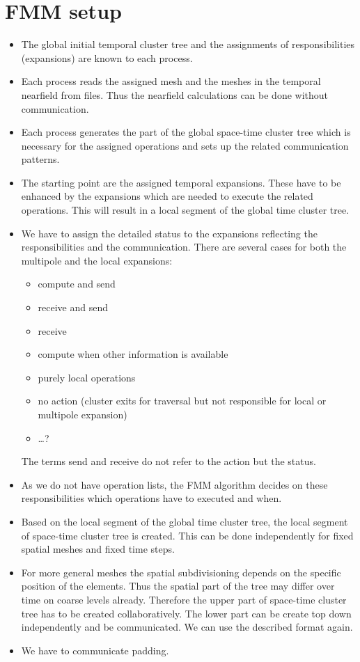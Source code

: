 \documentclass[a4paper,11pt]{article}
\theoremstyle{plain}
\theoremstyle{definition}
\theoremstyle{remark}
\begin{document}
\section{FMM setup}
\begin{itemize}
\item The global initial temporal cluster tree and the assignments of
  responsibilities (expansions)  are known to each process.
\item Each process reads the assigned mesh and the meshes in the temporal nearfield from
  files. Thus the nearfield calculations can be done without communication. 
\item Each process generates the part of the global space-time cluster tree
  which is necessary for the assigned operations and sets up the related
  communication patterns.
\item The starting point are the assigned temporal expansions. These have to be
  enhanced by the  expansions which are needed to execute the related
  operations. This will result in a local segment of the global time cluster tree.
\item We have to assign the detailed status to the expansions reflecting the
  responsibilities and the communication. There are several cases for both the
  multipole and the local expansions:
  \begin{itemize}
  \item compute and send
  \item receive and send
  \item receive 
  \item compute when other information is available
  \item purely local operations
  \item no action (cluster exits for traversal but not responsible for local or multipole expansion)
  \item \ldots ?
  \end{itemize}
  The terms send and receive do not refer to the action but the status.
  \item As we do not have operation lists, the FMM algorithm decides on these responsibilities
    which operations have to executed and when. 
\item Based on the local segment of the global time cluster tree, the local
  segment of space-time cluster tree is created. This can be done independently
  for fixed spatial meshes and fixed time steps.
\item For more general meshes the spatial subdivisioning depends on the
  specific position of the elements. Thus the spatial part of the tree may
  differ over time on coarse levels already. Therefore the upper part of
  space-time cluster tree has to be created collaboratively. The lower part can
  be create top down independently and be communicated. We can use the
  described format again. 
\item We have to communicate padding.
\end{itemize}
\end{document}
